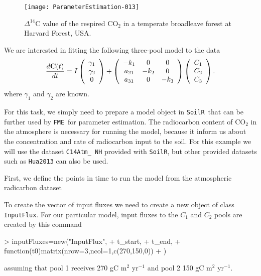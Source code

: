 \documentclass[a4paper]{article}
\newcommand{\SoilR}{\texttt{SoilR}}
\newcommand{\FME}{\texttt{FME}}
\begin{document}
\begin{figure}
  \centering
\texttt{[image: ParameterEstimation-013]}
  \caption{$\Delta^{14}$C value of the respired CO$_2$ in a temperate broadleave forest at Harvard Forest, USA.}
  \label{fig:radiocarbondata}
\end{figure}

We are interested in fitting the following three-pool model to the data
\begin{equation} \label{eq:HarvardForestModel}
\frac{d {\bf C}(t)}{dt} = I \left( \begin{array}{c} \gamma_1 \\ \gamma_2 \\ 0 \end{array} \right) +
\left( \begin{array}{ccc}
-k_1 & 0 & 0 \\
a_{21} & -k_2 & 0 \\
a_{31} & 0 & -k_3
\end{array} \right)
\left( \begin{array}{c} C_1 \\ C_2 \\ C_3 \end{array} \right).
\end{equation}
where $\gamma_1$ and $\gamma_2$ are known. 

For this task, we simply need to prepare a model object in \SoilR \, that can be further used by \FME \, for parameter estimation. 
The radiocarbon content of CO$_2$ in the atmosphere is necessary for running the model, because it inform us about the concentration and rate of radiocarbon input to the soil. For this example we will use the dataset {\tt C14Atm\_ NH} provided with \SoilR, but other provided datasets such as {\tt Hua2013} can also be used. 

First, we define the points in time to run the model from the atmospheric radicarbon dataset
\begin{Schunk}
\end{Schunk}

To create the vector of input fluxes we need to create a new object of class {\tt InputFlux}. For our particular model, input fluxes to the $C_1$ and $C_2$ pools are created by this command

\begin{Schunk}
\begin{Sinput}
> inputFluxes=new("InputFlux",
+                 t_start,
+                 t_end,
+                 function(t0){matrix(nrow=3,ncol=1,c(270,150,0))}
+ )
\end{Sinput}
\end{Schunk}
assuming that pool 1 receives 270 gC m$^{2}$ yr$^{-1}$ and pool 2 150 gC m$^{2}$ yr$^{-1}$. 
\end{document}
